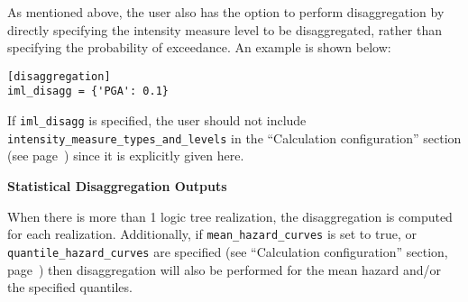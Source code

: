 As mentioned above, the user also has the option to perform disaggregation by
directly specifying the intensity measure level to be disaggregated, rather than
specifying the probability of exceedance. An example is shown below:

\begin{verbatim}
[disaggregation]
iml_disagg = {'PGA': 0.1}
\end{verbatim}

If \texttt{iml\_disagg} is specified, the user should not include
 \texttt{intensity\_measure\_types\_and\_levels} in the
``Calculation configuration'' section (see page~\pageref{sec:calculation_configuration})
since it is explicitly given here.

\textbf{Statistical Disaggregation Outputs}

 When there is more than 1 logic tree realization, the disaggregation is
 computed for each realization. Additionally, if \texttt{mean\_hazard\_curves}
 is set to true, or \texttt{quantile\_hazard\_curves} are specified (see
 ``Calculation configuration'' section, page~\pageref{sec:calculation_configuration})
 then disaggregation will also be performed for the mean hazard and/or the
 specified quantiles.
